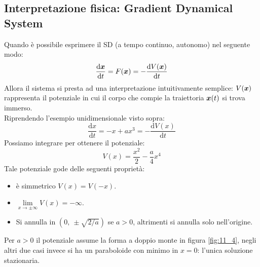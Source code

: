 \subsection{Interpretazione fisica: Gradient Dynamical System}%
\label{sub:Interpretazione fisica: Gradient Dynamical System}
Quando è possibile esprimere il SD (a tempo continuo, autonomo) nel seguente modo:
\[
    \frac{\text{d} \boldsymbol{x}}{\text{d} t} = F(\boldsymbol{x}) = - \frac{\text{d} V(\boldsymbol{x})}{\text{d} t} 
\] 
Allora il sistema si presta ad una interpretazione intuitivamente semplice: $V(\boldsymbol{x})$  rappresenta il potenziale in cui il corpo che compie la traiettoria $\boldsymbol{x} (t)$ si trova immerso.\\
Riprendendo l'esempio unidimensionale visto sopra:
\[
    \frac{\text{d} x}{\text{d} t} = - x + a x^3 = - \frac{\text{d} V(x)}{\text{d} t} 
\] 
Possiamo integrare per ottenere il potenziale:
\[
    V(x)=\frac{x^2}{2}-\frac{a}{4}x^4
\] 
Tale potenziale gode delle seguenti proprietà:
\begin{itemize}
    \item è simmetrico $V(x)=V(-x)$.
    \item $\lim\limits_{x \to \pm\infty} V(x)=-\infty$.
    \item Si annulla in $(0, \ \pm \sqrt{2 / a})$ se $a>0$, altrimenti si annulla solo nell'origine.
\end{itemize}
Per $a>0$ il potenziale assume la forma a doppio monte in figura \ref{fig:11_4}, negli altri due casi invece si ha un paraboloide con minimo in $x=0$: l'unica soluzione stazionaria.
